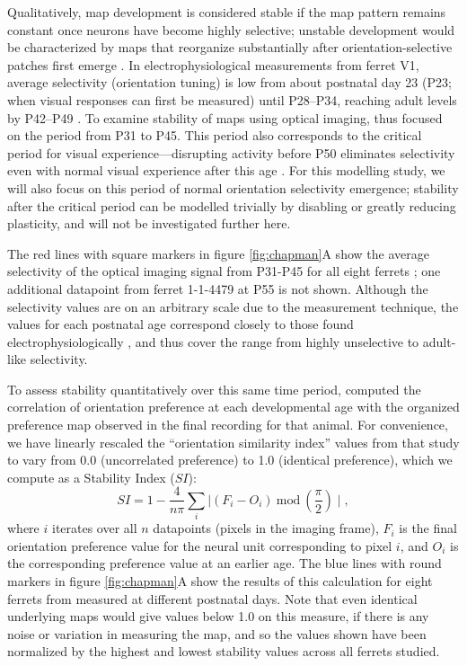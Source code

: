 \documentclass{article}
\begin{document}
  Qualitatively, map development is considered stable if the map
  pattern remains constant once neurons have become highly selective;
  unstable development would be characterized by maps that reorganize
  substantially after orientation-selective patches first emerge
  \citep{Chapman1996}.
  In electrophysiological measurements from ferret V1, average
  selectivity (orientation tuning) is low from about postnatal day 23
  (P23; when visual responses can first be measured) until P28--P34,
  reaching adult levels by P42--P49 \citep{Chapman1993}.  To examine
  stability of maps using optical imaging, \citet{Chapman1996} thus
  focused on the period from P31 to P45.  This period also corresponds
  to the critical period for visual experience---disrupting activity
  before P50 eliminates selectivity even with normal visual experience
  after this age \citep{chapman:jn00}.  For this modelling study,
  we will also focus on this period of normal orientation selectivity
  emergence; stability after the critical period can be modelled
  trivially by disabling or greatly reducing plasticity, and will not
  be investigated further here.

  The red lines with square markers in figure \ref{fig:chapman}A show
  the average selectivity of the optical imaging signal from P31-P45
  for all eight ferrets \citep{Chapman1996}; one additional datapoint
  from ferret 1-1-4479 at P55 is not shown. Although the selectivity
  values are on an arbitrary scale due to the measurement technique,
  the values for each postnatal age correspond closely to those found
  electrophysiologically \citep{Chapman1996}, and thus cover the range
  from highly unselective to adult-like selectivity.

To assess stability quantitatively over this same time period,
\citet{Chapman1996} computed the
correlation of orientation preference at each developmental age with
the organized preference map observed in the final recording for that
animal.  For convenience, we have linearly rescaled the ``orientation
similarity index'' values from that study to vary from 0.0
(uncorrelated preference) to 1.0 (identical preference), which we
compute as a Stability Index ($SI$):
\begin{equation}
SI =1-\frac{4}{n \pi}\sum_{i}{\mid(F_{i}-O_{i})~\mbox{mod}~\left(\frac{\pi}{2}\right) \mid},
\label{eqn:similarityindex}
\end{equation}
where $i$ iterates over all $n$ datapoints (pixels in the imaging
frame), $F_i$ is the final orientation preference value for the
neural unit corresponding to pixel $i$, and $O_i$ is the corresponding preference value at an earlier
age.  The blue lines with round markers in figure \ref{fig:chapman}A
show the results of this calculation for eight ferrets from
\citet{Chapman1996} measured at different postnatal days.
Note that even identical underlying maps would give values below
1.0 on this measure, if there is any noise or variation in measuring
the map, and so the values shown have been normalized by the highest and
lowest stability values across all ferrets studied.
\end{document}
